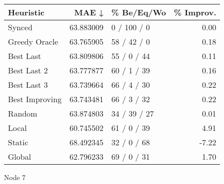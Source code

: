 \begin{tabular}{lrlr}
\toprule
      Heuristic &      MAE ↓ &    \% Be/Eq/Wo & \% Improv. \\
\midrule
         Synced &  63.883009 &   0 / 100 / 0 &      0.00 \\
  Greedy Oracle &  63.765905 &   58 / 42 / 0 &      0.18 \\
      Best Last &  63.809806 &   55 / 0 / 44 &      0.11 \\
    Best Last 2 &  63.777877 &   60 / 1 / 39 &      0.16 \\
    Best Last 3 &  63.739664 &   66 / 4 / 30 &      0.22 \\
 Best Improving &  63.743481 &   66 / 3 / 32 &      0.22 \\
         Random &  63.874803 &  34 / 39 / 27 &      0.01 \\
          Local &  60.745502 &   61 / 0 / 39 &      4.91 \\
         Static &  68.492345 &   32 / 0 / 68 &     -7.22 \\
         Global &  62.796233 &   69 / 0 / 31 &      1.70 \\
\bottomrule
\end{tabular}
\caption{Node 7}
\label{tab:non_lr001_le1_bs2_7}
